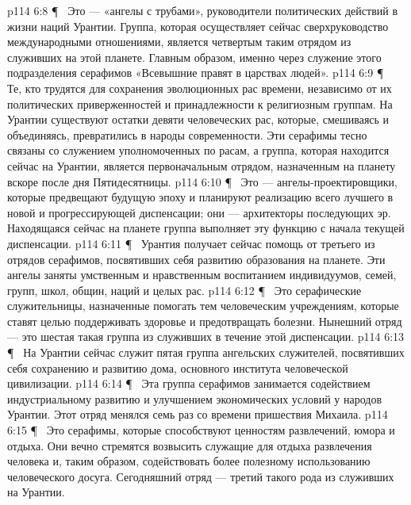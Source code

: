 \vs p114 6:8 \P\ \bibnobreakspace {} Это --- «ангелы с трубами», руководители политических действий в жизни наций Урантии. Группа, которая осуществляет сейчас сверхруководство международными отношениями, является четвертым таким отрядом из служивших на этой планете. Главным образом, именно через служение этого подразделения серафимов «Всевышние правят в царствах людей».
\vs p114 6:9 \P\ \bibnobreakspace {} Те, кто трудятся для сохранения эволюционных рас времени, независимо от их политических приверженностей и принадлежности к религиозным группам. На Урантии существуют остатки девяти человеческих рас, которые, смешиваясь и объединяясь, превратились в народы современности. Эти серафимы тесно связаны со служением уполномоченных по расам, а группа, которая находится сейчас на Урантии, является первоначальным отрядом, назначенным на планету вскоре после дня Пятидесятницы.
\vs p114 6:10 \P\ \bibnobreakspace {} Это --- ангелы\hyp{}проектировщики, которые предвещают будущую эпоху и планируют реализацию всего лучшего в новой и прогрессирующей диспенсации; они --- архитекторы последующих эр. Находящаяся сейчас на планете группа выполняет эту функцию с начала текущей диспенсации.
\vs p114 6:11 \P\ \bibnobreakspace {} Урантия получает сейчас помощь от третьего из отрядов серафимов, посвятивших себя развитию образования на планете. Эти ангелы заняты умственным и нравственным воспитанием индивидуумов, семей, групп, школ, общин, наций и целых рас.
\vs p114 6:12 \P\ \bibnobreakspace {} Это серафические служительницы, назначенные помогать тем человеческим учреждениям, которые ставят целью поддерживать здоровье и предотвращать болезни. Нынешний отряд --- это шестая такая группа из служивших в течение этой диспенсации.
\vs p114 6:13 \P\ \bibnobreakspace {} На Урантии сейчас служит пятая группа ангельских служителей, посвятивших себя сохранению и развитию дома, основного института человеческой цивилизации.
\vs p114 6:14 \P\ \bibnobreakspace {} Эта группа серафимов занимается содействием индустриальному развитию и улучшением экономических условий у народов Урантии. Этот отряд менялся семь раз со времени пришествия Михаила.
\vs p114 6:15 \P\ \bibnobreakspace {} Это серафимы, которые способствуют ценностям развлечений, юмора и отдыха. Они вечно стремятся возвысить служащие для отдыха развлечения человека и, таким образом, содействовать более полезному использованию человеческого досуга. Сегодняшний отряд --- третий такого рода из служивших на Урантии.
